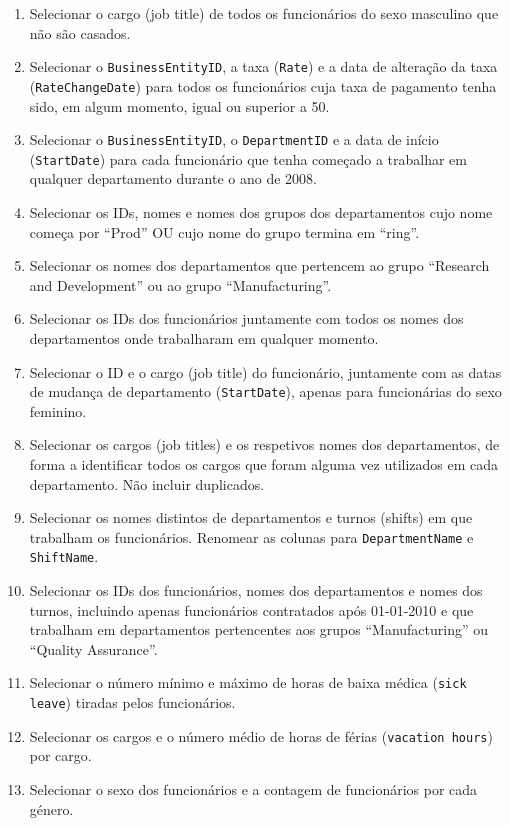 \documentclass{article}
\begin{document}
\begin{enumerate}
    \item Selecionar o cargo (job title) de todos os funcionários do sexo masculino que não são casados.
    \item Selecionar o \texttt{BusinessEntityID}, a taxa (\texttt{Rate}) e a data de alteração da taxa (\texttt{RateChangeDate}) para todos os funcionários cuja taxa de pagamento tenha sido, em algum momento, igual ou superior a 50.
    \item Selecionar o \texttt{BusinessEntityID}, o \texttt{DepartmentID} e a data de início (\texttt{StartDate}) para cada funcionário que tenha começado a trabalhar em qualquer departamento durante o ano de 2008.
    \item Selecionar os IDs, nomes e nomes dos grupos dos departamentos cujo nome começa por ``Prod'' OU cujo nome do grupo termina em ``ring''.
    \item Selecionar os nomes dos departamentos que pertencem ao grupo ``Research and Development'' ou ao grupo ``Manufacturing''.
    \item Selecionar os IDs dos funcionários juntamente com todos os nomes dos departamentos onde trabalharam em qualquer momento.
    \item Selecionar o ID e o cargo (job title) do funcionário, juntamente com as datas de mudança de departamento (\texttt{StartDate}), apenas para funcionárias do sexo feminino.
    \item Selecionar os cargos (job titles) e os respetivos nomes dos departamentos, de forma a identificar todos os cargos que foram alguma vez utilizados em cada departamento. Não incluir duplicados.
    \item Selecionar os nomes distintos de departamentos e turnos (shifts) em que trabalham os funcionários. Renomear as colunas para \texttt{DepartmentName} e \texttt{ShiftName}.
    \item Selecionar os IDs dos funcionários, nomes dos departamentos e nomes dos turnos, incluindo apenas funcionários contratados após 01-01-2010 e que trabalham em departamentos pertencentes aos grupos ``Manufacturing'' ou ``Quality Assurance''.
    \item Selecionar o número mínimo e máximo de horas de baixa médica (\texttt{sick leave}) tiradas pelos funcionários.
    \item Selecionar os cargos e o número médio de horas de férias (\texttt{vacation hours}) por cargo.
    \item Selecionar o sexo dos funcionários e a contagem de funcionários por cada género.

\end{enumerate}
\end{document}
